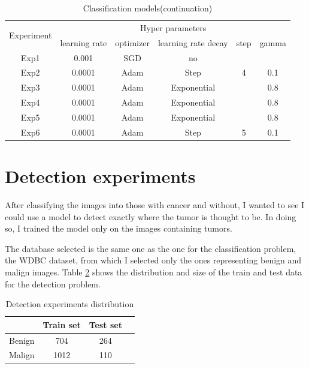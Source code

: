 \begin{table}[H]
    \centering
    \begin{tabular}{|c|c|c|c|c|c|}
        \hline
        \multirow{2}{5em}{Experiment}  & \multicolumn{5}{c|}{Hyper parameters} \\ \cline{2-6}
         & learning rate & optimizer & learning rate decay & step & gamma \\
        \hline \hline
        Exp1 & 0.001 & SGD & no &  &   \\
        \hline
        Exp2 & 0.0001 & Adam & Step & 4 & 0.1 \\
        \hline
        Exp3 & 0.0001 & Adam & Exponential & & 0.8\\
        \hline
        Exp4 & 0.0001 & Adam & Exponential & & 0.8\\
        \hline
        Exp5 & 0.0001 & Adam & Exponential & & 0.8\\
        \hline 
        Exp6 & 0.0001 & Adam & Step & 5 & 0.1\\
        \hline
    \end{tabular}
    \caption{Classification models(continuation)}
    \label{tab:tab5}
\end{table}

\section{Detection experiments}

After classifying the images into those with cancer and without, I wanted to see I could use a model to detect exactly where the tumor is thought to be. In doing so, I trained the model only on the images containing tumors.

The database selected is the same one as the one for the classification problem, the WDBC dataset, from which I selected only the ones representing benign and malign images. Table \ref{tab:tab7} shows the distribution and size of the train and test data for the detection problem.

\begin{table}[ht!]
\centering
\begin{tabular}{|c|c|c|c|}
    \hline
     & Train set & Test set \\ \hline
    Benign & 704 & 264 \\ \hline
    Malign & 1012 & 110\\ \hline
    \end{tabular}
    \caption{Detection experiments distribution}
    \label{tab:tab7}
\end{table}

